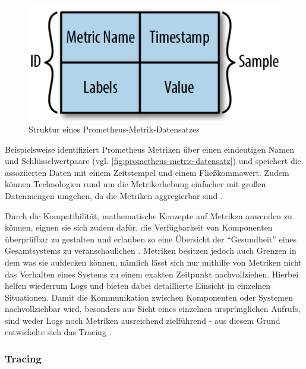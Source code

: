 \begin{figure}
\centering
\includegraphics[width=\linewidth]{img/03_methoden/prometheus-metric-sample.png}
\caption{Struktur eines Prometheus-Metrik-Datensatzes \cite{DistributedSystemsObservability}}
\label{fig:prometheus-metric-datensatz}
\end{figure}

Beispielsweise identifiziert Prometheus \cite{Prometheus} Metriken über einen eindeutigen Namen und Schlüsselwertpaare (vgl. \autoref{fig:prometheus-metric-datensatz}) und speichert die assoziierten Daten mit einem Zeitstempel und einem Fließkommawert. Zudem können Technologien rund um die Metrikerhebung einfacher mit großen Datenmengen umgehen, da die Metriken aggregierbar sind \cite{DistributedSystemsObservability}.

Durch die Kompatibilität, mathematische Konzepte auf Metriken anwenden zu können, eignen sie sich zudem dafür, die Verfügbarkeit von Komponenten überprüfbar zu gestalten und erlauben so eine Übersicht der \enquote{Gesundheit} eines Gesamtsystems zu veranschaulichen \cite{MultilevelObservabilityInCloudOrchestration} \cite{DistributedSystemsObservability}. Metriken besitzen jedoch auch Grenzen in dem was sie aufdecken können, nämlich lässt sich nur mithilfe von Metriken nicht das Verhalten eines Systems zu einem exakten Zeitpunkt nachvollziehen. Hierbei helfen wiederrum Logs und bieten dabei detaillierte Einsicht in einzelnen Situationen. Damit die Kommunikation zwischen Komponenten oder Systemen nachvollziehbar wird, besonders aus Sicht eines einzelnen ursprünglichen Aufrufs, sind weder Logs noch Metriken ausreichend zielführend - aus diesem Grund entwickelte sich das Tracing \cite{MultilevelObservabilityInCloudOrchestration} \cite{DistributedSystemsObservability}.

\subsubsection{Tracing}
\label{sec:tracing}

